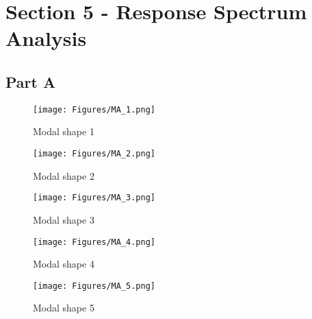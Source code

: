 \documentclass[11pt]{article}
\begin{document}
    \section{Section 5 - Response Spectrum
Analysis}\label{section-5---response-spectrum-analysis}

\subsection{Part A}\label{part-a}

\captionsetup{format=plain, labelformat=empty, aboveskip=5pt,belowskip=5pt}
\begin{figure}
	\centering
	\texttt{[image: Figures/MA\_1.png]}
	\caption{Modal shape 1}
\end{figure}
\begin{figure}
	\centering
	\texttt{[image: Figures/MA\_2.png]}
	\caption{Modal shape 2}
\end{figure}

\begin{figure}
	\centering
	\texttt{[image: Figures/MA\_3.png]}
	\caption{Modal shape 3}
\end{figure}

\begin{figure}
	\centering
	\texttt{[image: Figures/MA\_4.png]}
	\caption{Modal shape 4}
\end{figure}
\begin{figure}
	\centering
	\texttt{[image: Figures/MA\_5.png]}
	\caption{Modal shape 5}
\end{figure}
 \captionsetup{format=nocaption,aboveskip=0pt,belowskip=0pt}
\end{document}
